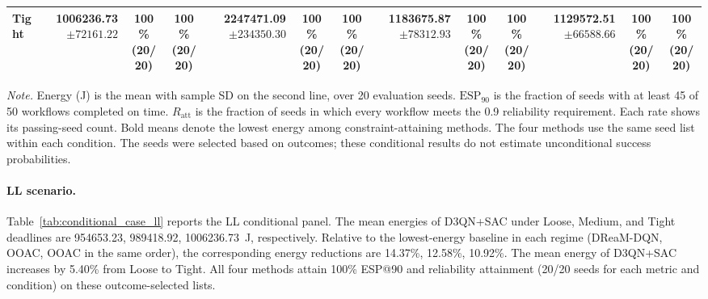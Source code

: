 \documentclass[10pt]{article}
\begin{document}
\begin{table}[!htbp]
\begin{tabular}{@{}l*{4}{rcc}@{}}
Tight & \shortstack[r]{\textbf{1006236.73}\\$\pm 72161.22$} & \shortstack[c]{100\%\\(20/20)} & \shortstack[c]{100\%\\(20/20)} & \shortstack[r]{2247471.09\\$\pm 234350.30$} & \shortstack[c]{100\%\\(20/20)} & \shortstack[c]{100\%\\(20/20)} & \shortstack[r]{1183675.87\\$\pm 78312.93$} & \shortstack[c]{100\%\\(20/20)} & \shortstack[c]{100\%\\(20/20)} & \shortstack[r]{1129572.51\\$\pm 66588.66$} & \shortstack[c]{100\%\\(20/20)} & \shortstack[c]{100\%\\(20/20)} \\
\bottomrule
\end{tabular}
\par\vspace{3pt}
\parbox{\textwidth}{\footnotesize
\textit{Note.} Energy (J) is the mean with sample SD on the second line, over 20 evaluation seeds.
$\mathrm{ESP}_{90}$ is the fraction of seeds with at least 45 of 50 workflows completed on time.
$R_{\mathrm{att}}$ is the fraction of seeds in which every workflow meets the 0.9 reliability requirement.
Each rate shows its passing-seed count. Bold means denote the lowest energy among constraint-attaining methods.
The four methods use the same seed list within each condition.
The seeds were selected based on outcomes; these conditional results do not estimate unconditional success probabilities.}
\endgroup
\end{table}

\paragraph{LL scenario.}
Table~\ref{tab:conditional_case_ll} reports the LL conditional panel. The mean energies of D3QN+SAC under Loose, Medium, and Tight deadlines are 954653.23, 989418.92, 1006236.73~J, respectively. Relative to the lowest-energy baseline in each regime (DReaM-DQN, OOAC, OOAC in the same order), the corresponding energy reductions are 14.37\%, 12.58\%, 10.92\%. The mean energy of D3QN+SAC increases by 5.40\% from Loose to Tight. All four methods attain 100\% ESP@90 and reliability attainment (20/20 seeds for each metric and condition) on these outcome-selected lists.
\clearpage
\end{document}
